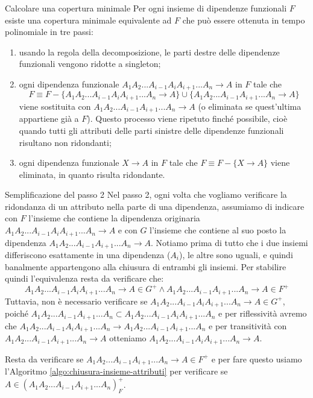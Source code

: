 \begin{Algoritmo}{Calcolare una copertura minimale}{}
    Per ogni insieme di dipendenze funzionali $F$ esiste una copertura minimale equivalente ad $F$ che può essere ottenuta in tempo polinomiale in tre passi:
    \begin{enumerate}
        \item usando la regola della decomposizione, le parti destre delle dipendenze funzionali vengono ridotte a singleton;
        \item ogni dipendenza funzionale $A_1A_2...A_{i-1}A_iA_{i+1}...A_n \to A$ in $F$ tale che
        \begin{equation*}
            F\equiv F-\{A_1A_2...A_{i-1}A_iA_{i+1}...A_n \to A\}\cup\{A_1A_2...A_{i-1}A_{i+1}...A_n \to A\}
        \end{equation*}
        viene sostituita con $A_1A_2...A_{i-1}A_{i+1}...A_n \to A$ (o eliminata se quest'ultima appartiene già a $F$). Questo processo viene ripetuto finché possibile, cioè quando tutti gli attributi delle parti sinistre delle dipendenze funzionali risultano non ridondanti;
        \item ogni dipendenza funzionale $X \to A$ in $F$ tale che $F\equiv F - \{ X \to A\}$ viene eliminata, in quanto risulta ridondante.
    \end{enumerate}
\end{Algoritmo}

\begin{Osservation}{Semplificazione del passo 2}{}
    Nel passo 2, ogni volta che vogliamo verificare la ridondanza di un attributo nella parte di una dipendenza, assumiamo di indicare con $F$ l'insieme che contiene la dipendenza originaria $A_1A_2...A_{i-1}A_iA_{i+1}...A_n \to A$ e con $G$ l'insieme che contiene al suo posto la dipendenza $A_1A_2...A_{i-1}A_{i+1}...A_n \to A$. Notiamo prima di tutto che i due insiemi differiscono esattamente in una dipendenza ($A_i$), le altre sono uguali, e quindi banalmente appartengono alla chiusura di entrambi gli insiemi. Per stabilire quindi l'equivalenza resta da verificare che:
    \begin{equation*}
        A_1A_2...A_{i-1}A_iA_{i+1}...A_n \to A\in G^+ \land A_1A_2...A_{i-1}A_{i+1}...A_n \to A\in F^+
    \end{equation*}
    Tuttavia, non è necessario verificare se $A_1A_2...A_{i-1}A_iA_{i+1}...A_n \to A\in G^+$, poiché $A_1A_2...A_{i-1}A_{i+1}...A_n\subset A_1A_2...A_{i-1}A_iA_{i+1}...A_n$ e per riflessività avremo che $A_1A_2...A_{i-1}A_iA_{i+1}...A_n\to A_1A_2...A_{i-1}A_{i+1}...A_n$ e per transitività con $A_1A_2...A_{i-1}A_{i+1}...A_n\to A$ otteniamo $ A_1A_2...A_{i-1}A_iA_{i+1}...A_n\to A$.

    Resta da verificare se $A_1A_2...A_{i-1}A_{i+1}...A_n \to A\in F^+$ e per fare questo usiamo l'Algoritmo \ref{algo:chiusura-insieme-attributi} per verificare se $A \in(A_1A_2...A_{i-1}A_{i+1}...A_n)^+_F$.
\end{Osservation}

